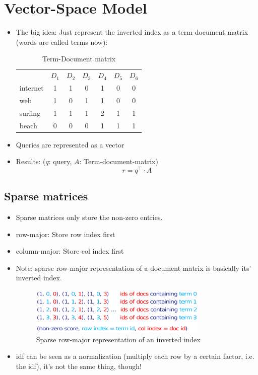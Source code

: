 \documentclass[a4paper]{scrartcl}
\newcommand{\blu}[1]{\textcolor{mainblue}{#1}}
\begin{document}
\section{Vector-Space Model}
\label{sec:vector_space_model}
\begin{itemize}
\item The big idea: Just represent the inverted index as a term-document matrix
  (words are called terms now):
  \begin{table}[h!tbp]
    \centering
    \begin{tabular}{lcccccc}
      &$D_1$&$D_2$&$D_3$&$D_4$&$D_5$&$D_6$ \\
      internet & 1 & 1 & 0& 1 & 0 & 0 \\
      web & 1 & 0 & 1 & 1 & 0 & 0\\
      surfing & 1 & 1 & 1 & 2 & 1 & 1 \\
      beach & 0 & 0 & 0 & 1 & 1 & 1\\
    \end{tabular}
    \caption{Term-Document matrix}
    \label{tab:term_document_matrix}
  \end{table}
\item Queries are represented as a vector
\item Results: ($q$: query, $A$: Term-document-matrix)
  \begin{equation}
    \label{eq:vsm_result}
     r = q^\top \cdot A
  \end{equation}
\end{itemize}

\subsection{Sparse matrices}
\label{sec:sparse_matrices}
\begin{itemize}
\item Sparse matrices only store the non-zero entries.
\item row-major: Store row index first
\item column-major: Store col index first
\item Note: sparse row-major representation of a document matrix is basically
  its' \blu{inverted index}.
  \begin{figure}[h!tbp]
    \centering
    \includegraphics[width=0.8\textwidth]{figures/sparse_ii}
    \caption{Sparse row-major representation of an inverted index}
    \label{fig:sparse_ii}
  \end{figure}
\item idf can be seen as a normalization (multiply each row by a certain factor,
  i.e. the idf), it's not the same thing, though!
\end{itemize}
\end{document}
